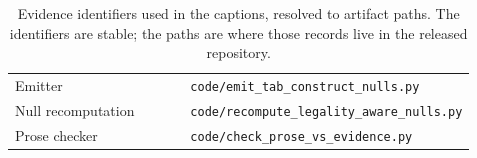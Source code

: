 \begin{table}[t]
\begin{tabular}{lp{0.62\linewidth}}
Emitter & \texttt{code/emit\_tab\_construct\_nulls.py} \\
Null recomputation & \texttt{code/recompute\_legality\_aware\_nulls.py} \\
Prose checker & \texttt{code/check\_prose\_vs\_evidence.py} \\
\bottomrule
\end{tabular}
\caption{Evidence identifiers used in the captions, resolved to artifact paths. The identifiers are stable; the paths are where those records live in the released repository.}
\label{tab:artifact-map}
\end{table}
